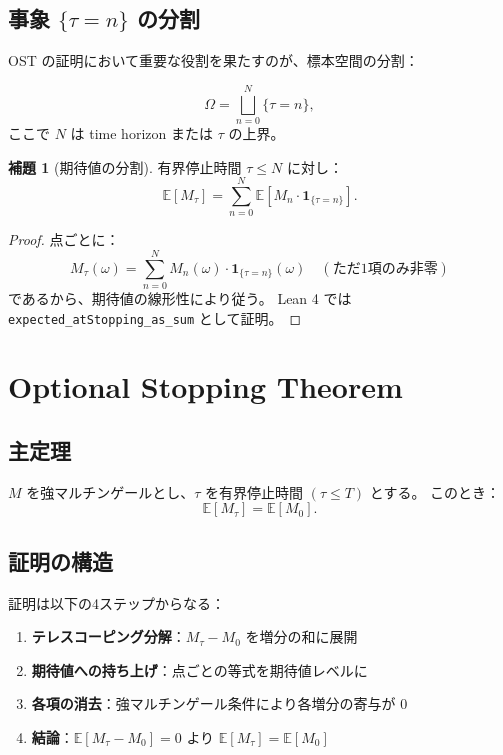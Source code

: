 \documentclass[a4paper,12pt]{ltjsarticle}
\theoremstyle{definition}
\newtheorem{lemma}[definition]{補題}
\begin{document}
\subsection{事象 $\{\tau = n\}$ の分割}

OST の証明において重要な役割を果たすのが、標本空間の分割：

\begin{equation}
  \Omega = \bigsqcup_{n=0}^{N} \{\tau = n\},
\end{equation}
ここで $N$ は time horizon または $\tau$ の上界。

\begin{lemma}[期待値の分割]
有界停止時間 $\tau \leq N$ に対し：
\[
  \mathbb{E}[M_\tau] = \sum_{n=0}^{N} \mathbb{E}[M_n \cdot \mathbf{1}_{\{\tau = n\}}].
\]
\end{lemma}

\begin{proof}
点ごとに：
\[
  M_\tau(\omega) = \sum_{n=0}^{N} M_n(\omega) \cdot \mathbf{1}_{\{\tau = n\}}(\omega)
  \quad (\text{ただ1項のみ非零})
\]
であるから、期待値の線形性により従う。
Lean 4 では \texttt{expected\_atStopping\_as\_sum} として証明。
\end{proof}

\section{Optional Stopping Theorem}

\subsection{主定理}

\begin{maintheorem}
$M$ を強マルチンゲールとし、$\tau$ を有界停止時間 $(\tau \leq T)$ とする。
このとき：
\[
  \mathbb{E}[M_\tau] = \mathbb{E}[M_0].
\]
\end{maintheorem}

\subsection{証明の構造}

証明は以下の4ステップからなる：

\begin{keyidea}[証明の方針]
\begin{enumerate}
  \item \textbf{テレスコーピング分解}：$M_\tau - M_0$ を増分の和に展開
  \item \textbf{期待値への持ち上げ}：点ごとの等式を期待値レベルに
  \item \textbf{各項の消去}：強マルチンゲール条件により各増分の寄与が 0
  \item \textbf{結論}：$\mathbb{E}[M_\tau - M_0] = 0$ より $\mathbb{E}[M_\tau] = \mathbb{E}[M_0]$
\end{enumerate}
\end{keyidea}
\end{document}
